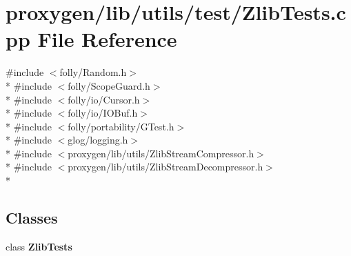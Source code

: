 \section{proxygen/lib/utils/test/\+Zlib\+Tests.cpp File Reference}
\label{ZlibTests_8cpp}
{\ttfamily \#include $<$folly/\+Random.\+h$>$}\\*
{\ttfamily \#include $<$folly/\+Scope\+Guard.\+h$>$}\\*
{\ttfamily \#include $<$folly/io/\+Cursor.\+h$>$}\\*
{\ttfamily \#include $<$folly/io/\+I\+O\+Buf.\+h$>$}\\*
{\ttfamily \#include $<$folly/portability/\+G\+Test.\+h$>$}\\*
{\ttfamily \#include $<$glog/logging.\+h$>$}\\*
{\ttfamily \#include $<$proxygen/lib/utils/\+Zlib\+Stream\+Compressor.\+h$>$}\\*
{\ttfamily \#include $<$proxygen/lib/utils/\+Zlib\+Stream\+Decompressor.\+h$>$}\\*
\subsection*{Classes}
\begin{DoxyCompactItemize}
\item 
class {\bf Zlib\+Tests}
\end{DoxyCompactItemize}
